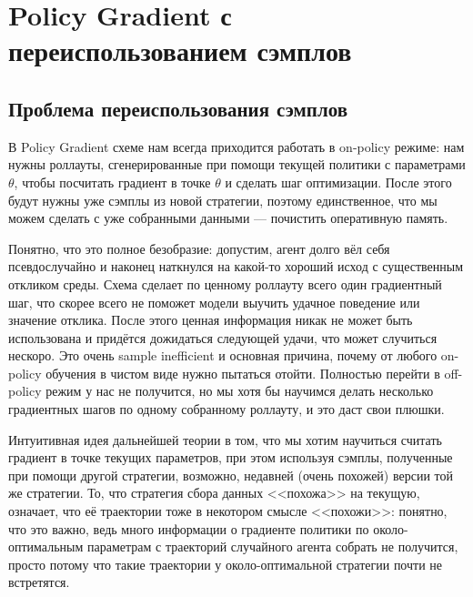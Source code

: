 \section{Policy Gradient с переиспользованием сэмплов}\label{TRPOPPOsection}

\subsection{Проблема переиспользования сэмплов}

В Policy Gradient схеме нам всегда приходится работать в on-policy режиме: нам нужны роллауты, сгенерированные при помощи текущей политики с параметрами $\theta$, чтобы посчитать градиент в точке $\theta$ и сделать шаг оптимизации. После этого будут нужны уже сэмплы из новой стратегии, поэтому единственное, что мы можем сделать с уже собранными данными --- почистить оперативную память.

Понятно, что это полное безобразие: допустим, агент долго вёл себя псевдослучайно и наконец наткнулся на какой-то хороший исход с существенным откликом среды. Схема сделает по ценному роллауту всего один градиентный шаг, что скорее всего не поможет модели выучить удачное поведение или значение отклика. После этого ценная информация никак не может быть использована и придётся дожидаться следующей удачи, что может случиться нескоро. Это очень sample inefficient и основная причина, почему от любого on-policy обучения в чистом виде нужно пытаться отойти. Полностью перейти в off-policy режим у нас не получится, но мы хотя бы научимся делать несколько градиентных шагов по одному собранному роллауту, и это даст свои плюшки.

Интуитивная идея дальнейшей теории в том, что мы хотим научиться считать градиент в точке текущих параметров, при этом используя сэмплы, полученные при помощи другой стратегии, возможно, недавней (очень похожей) версии той же стратегии. То, что стратегия сбора данных <<похожа>> на текущую, означает, что её траектории тоже в некотором смысле <<похожи>>: понятно, что это важно, ведь много информации о градиенте политики по около-оптимальным параметрам с траекторий случайного агента собрать не получится, просто потому что такие траектории у около-оптимальной стратегии почти не встретятся.

